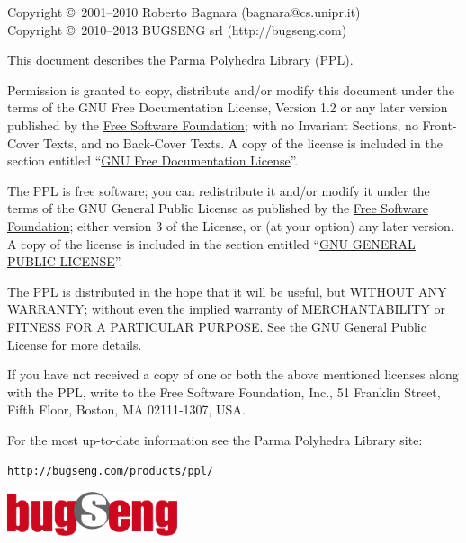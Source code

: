 \documentclass[a4paper,twoside]{article}
\begin{document}
\newpage
Copyright \copyright\ 2001--2010 Roberto Bagnara (bagnara@cs.unipr.it) \\
Copyright \copyright\ 2010--2013 BUGSENG srl (http://bugseng.com)


This document describes the Parma Polyhedra Library (PPL).

Permission is granted to copy, distribute and/or modify this document
under the terms of the GNU Free Documentation License, Version 1.2
or any later version published by the
\href{http://www.fsf.org}{Free Software Foundation};
with no Invariant Sections, no Front-Cover Texts, and no Back-Cover Texts.
A copy of the license is included in the section entitled
``\hyperlink{GFDL_GFDL}{GNU Free Documentation License}''.

The PPL is free software; you can redistribute it and/or modify it
under the terms of the GNU General Public License as published by the
\href{http://www.fsf.org}{Free Software Foundation}; either version 3
of the License, or (at your option) any later version.
A copy of the license is included in the section entitled
``\hyperlink{GPL_GPL}{GNU GENERAL PUBLIC LICENSE}''.

The PPL is distributed in the hope that it will be useful, but WITHOUT
ANY WARRANTY; without even the implied warranty of MERCHANTABILITY or
FITNESS FOR A PARTICULAR PURPOSE.  See the GNU General Public License
for more details.

If you have not received a copy of one or both the above mentioned
licenses along with the PPL, write to the Free Software Foundation,
Inc., 51 Franklin Street, Fifth Floor, Boston, MA 02111-1307, USA.

For the most up-to-date information see the Parma Polyhedra Library
site:
\begin{center}
\href{http://bugseng.com/products/ppl/}{\tt http://bugseng.com/products/ppl/}
\end{center}
\vfill
\begin{center}
\includegraphics[width=5cm]{bugseng_logo.pdf}
\end{center}
\vfill
\clearpage{\pagestyle{empty}\cleardoublepage}


\addtolength{\cftsubsecnumwidth}{1em}

\tableofcontents
\clearpage{\pagestyle{empty}\cleardoublepage}

\end{document}
